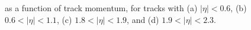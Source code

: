 \begin{figure}[htbp]
{}
\\
~
\caption{\epcor as a function of track momentum, for tracks with (a) $|\eta| < 0.6$, (b) $0.6 <  |\eta| < 1.1$, (c) $1.8 <  |\eta| < 1.9$, and (d) $1.9 <  |\eta| < 2.3$. }
\label{fig:eoverp_corrected}
\end{figure}


